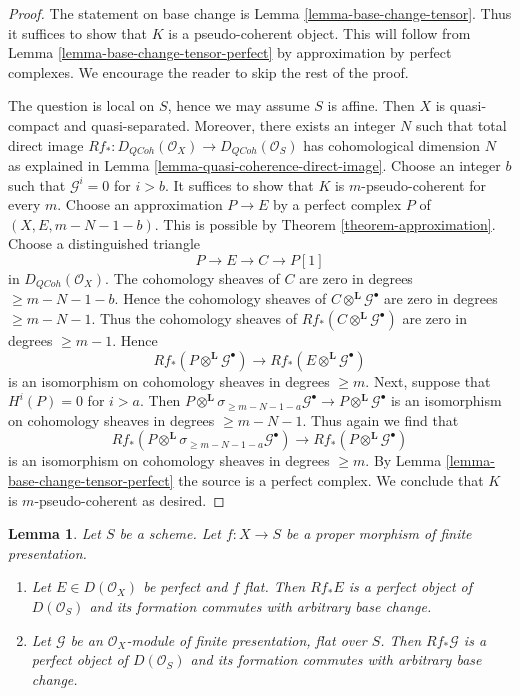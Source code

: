 \documentclass{stacks-project}
\theoremstyle{plain}
\newtheorem{lemma}[subsection]{Lemma}
\theoremstyle{definition}
\theoremstyle{remark}
\numberwithin{equation}{subsection}
\def\QCoh{\mathit{QCoh}}
\begin{document}
\begin{proof}
The statement on base change is Lemma \ref{lemma-base-change-tensor}.
Thus it suffices to show that $K$ is a pseudo-coherent object.
This will follow from Lemma \ref{lemma-base-change-tensor-perfect}
by approximation by perfect complexes. We encourage the reader to
skip the rest of the proof.

\medskip\noindent
The question is local on $S$, hence we may assume $S$ is affine.
Then $X$ is quasi-compact and quasi-separated. Moreover, there
exists an integer $N$ such that total direct image
$Rf_* : D_\QCoh(\mathcal{O}_X) \to D_\QCoh(\mathcal{O}_S)$
has cohomological dimension $N$ as explained in
Lemma \ref{lemma-quasi-coherence-direct-image}.
Choose an integer $b$ such that $\mathcal{G}^i = 0$ for $i > b$.
It suffices to show that $K$ is $m$-pseudo-coherent for
every $m$. Choose an approximation $P \to E$ by a perfect complex $P$
of $(X, E, m - N - 1 - b)$. This is possible by
Theorem \ref{theorem-approximation}.
Choose a distinguished triangle
$$
P \to E \to C \to P[1]
$$
in $D_\QCoh(\mathcal{O}_X)$. The cohomology sheaves of $C$ are zero
in degrees $\geq m - N - 1 - b$. Hence the cohomology sheaves of
$C \otimes^\mathbf{L} \mathcal{G}^\bullet$ are zero in degrees
$\geq m - N - 1$. Thus the cohomology sheaves of
$Rf_*(C \otimes^\mathbf{L} \mathcal{G}^\bullet)$
are zero in degrees $\geq m - 1$.
Hence
$$
Rf_*(P \otimes^\mathbf{L} \mathcal{G}^\bullet) \to
Rf_*(E \otimes^\mathbf{L} \mathcal{G}^\bullet)
$$
is an isomorphism on cohomology sheaves in degrees $\geq m$.
Next, suppose that $H^i(P) = 0$ for $i > a$. Then
$
P \otimes^\mathbf{L} \sigma_{\geq m - N - 1 - a}\mathcal{G}^\bullet
\longrightarrow
P \otimes^\mathbf{L} \mathcal{G}^\bullet
$
is an isomorphism on cohomology sheaves in degrees $\geq m - N - 1$.
Thus again we find that
$$
Rf_*(P \otimes^\mathbf{L} \sigma_{\geq m - N - 1 - a}\mathcal{G}^\bullet) \to
Rf_*(P \otimes^\mathbf{L} \mathcal{G}^\bullet)
$$
is an isomorphism on cohomology sheaves in degrees $\geq m$.
By Lemma \ref{lemma-base-change-tensor-perfect} the source
is a perfect complex.
We conclude that $K$ is $m$-pseudo-coherent as desired.
\end{proof}

\begin{lemma}
\label{lemma-flat-proper-perfect-direct-image-general}
Let $S$ be a scheme. Let $f : X \to S$ be a proper
morphism of finite presentation.
\begin{enumerate}
\item Let $E \in D(\mathcal{O}_X)$ be perfect and $f$ flat. Then
$Rf_*E$ is a perfect object of $D(\mathcal{O}_S)$ and its formation
commutes with arbitrary base change.
\item Let $\mathcal{G}$ be an $\mathcal{O}_X$-module of finite presentation,
flat over $S$. Then $Rf_*\mathcal{G}$ is a perfect object of
$D(\mathcal{O}_S)$ and its formation commutes with arbitrary base change.
\end{enumerate}
\end{lemma}
\end{document}
